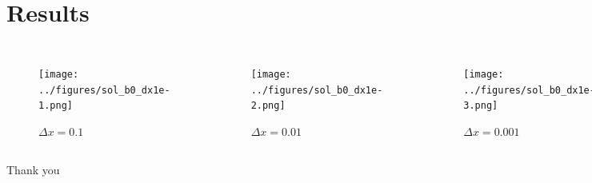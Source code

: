 \documentclass[compress]{beamer}
\begin{document}
\section{Results}
\begin{frame}
\begin{columns}
\hspace{-0.75cm}
\begin{figure}
\texttt{[image: ../figures/sol\_b0\_dx1e-1.png]}
\vspace{-0.75cm}
\caption{\footnotesize{$\Delta x = 0.1$}}
\end{figure}
\begin{figure}
\texttt{[image: ../figures/sol\_b0\_dx1e-2.png]}
\vspace{-0.75cm}
\caption{\footnotesize{$\Delta x = 0.01$}}
\end{figure}
\begin{figure}
\texttt{[image: ../figures/sol\_b0\_dx1e-3.png]}
\vspace{-0.75cm}
\caption{\footnotesize{$\Delta x = 0.001$}}
\end{figure}
\end{columns}
\end{frame}



\begin{frame}
\centering
\Huge
Thank you
\end{frame}
\end{document}
